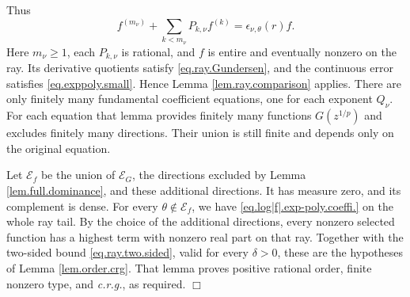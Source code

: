 \documentclass[a4paper,12pt]{article}
\newenvironment{proof}
{\noindent{\it Proof.}}{\hfill $\Box$\par\vspace{2.5mm}}
\numberwithin{equation}{section}
\begin{document}
\begin{proof}
Thus
\[
 f^{(m_\nu)}+\sum_{k<m_\nu}P_{k,\nu}f^{(k)}
 =\epsilon_{\nu,\theta}(r)f.
\]
Here $m_\nu\ge1$, each $P_{k,\nu}$ is rational, and $f$ is entire and
eventually nonzero on the ray. Its derivative quotients satisfy
\eqref{eq.ray.Gundersen}, and the continuous error satisfies
\eqref{eq.exppoly.small}. Hence Lemma \ref{lem.ray.comparison} applies.
There are only finitely many fundamental coefficient equations,
one for each exponent $Q_\nu$. For each equation that lemma provides
finitely many functions $G(z^{1/p})$ and excludes finitely many directions.
Their union is still finite and depends only on the original equation.

Let $\mathcal E_f$ be the union of $\mathcal E_G$, the directions
excluded by Lemma \ref{lem.full.dominance}, and these additional
directions. It has measure zero, and its complement is dense.
For every $\theta\notin\mathcal E_f$, we have
\eqref{eq.log|f|.exp-poly.coeffi.} on the whole ray tail.
By the choice of the additional directions, every nonzero selected
function has a highest term with nonzero real part on that ray.
Together with the two-sided bound \eqref{eq.ray.two.sided}, valid for
every $\delta>0$, these are the hypotheses of Lemma \ref{lem.order.crg}.
That lemma proves positive rational order, finite nonzero type, and
\textit{c.r.g.}, as required.
\end{proof}
\end{document}
